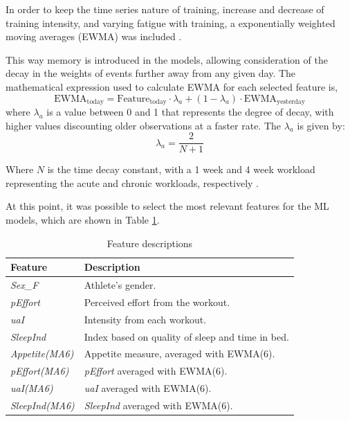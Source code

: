 \documentclass[conference]{IEEEtran}
\begin{document}
In order to keep the time series nature of training, increase and decrease of training intensity, and varying fatigue with training, a exponentially weighted moving averages (EWMA) was included \cite{Williams17}.

This way memory is introduced in the models, allowing consideration of the decay in the weights of events further away from any given day. The mathematical expression used to calculate EWMA for each selected feature is,
\begin{equation*}
    \text{EWMA}_{\text{today}} = \text{Feature}_{\text{today}} \cdot \lambda_a + (1 - \lambda_a) \cdot \text{EWMA}_{\text{yesterday}}
\end{equation*}
where $\lambda_a$ is a value between 0 and 1 that represents the degree of decay, with higher values discounting older observations at a faster rate. The $\lambda_a$ is given by:
\begin{equation*}
    \lambda_a = \frac{2}{N + 1}
\end{equation*} 

Where $N$ is the time decay constant, with a 1 week and 4 week workload representing the acute and chronic workloads, respectively \cite{Murray16}.

At this point, it was possible to select the most relevant features for the ML models, which are shown in Table \ref{features_selection}.

\begin{table}[H]
\centering
\caption{Feature descriptions}
\label{features_selection}
\begin{tabular}{ll}
\toprule
\textbf{Feature} & \textbf{Description} \\
\midrule
\textit{Sex\_F} & Athlete's gender.  \\
\textit{pEffort} & Perceived effort from the workout. \\
\textit{uaI} & Intensity from each workout. \\
\textit{SleepInd} & Index based on quality of sleep and time in bed. \\
\textit{Appetite(MA6)} & Appetite measure, averaged with EWMA(6). \\
\textit{pEffort(MA6)} & \textit{pEffort} averaged with EWMA(6). \\
\textit{uaI(MA6)} & \textit{uaI} averaged with EWMA(6). \\
\textit{SleepInd(MA6)} & \textit{SleepInd} averaged with EWMA(6). \\
\bottomrule
\end{tabular}
\end{table}
\end{document}
